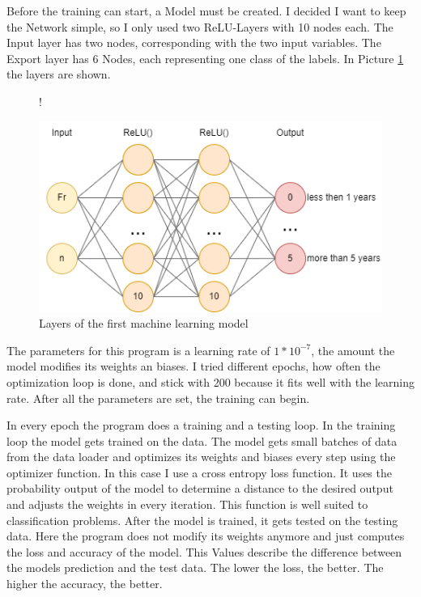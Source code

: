 \documentclass[a4paper, 12pt, oneside]{scrbook}
\begin{document}
				\noindent Before the training can start, a Model must be created. I decided I want to keep the Network simple, so I only used two ReLU-Layers with 10 nodes each. The Input layer has two nodes, corresponding with the two input variables. The Export layer has 6 Nodes, each representing one class of the labels. In Picture \ref{fig:layer_first} the layers are shown. 
				
				\begin{figure} [H]
					\centering
					\resizebox{\linewidth} {!} {
						\includegraphics{res/firstEDA/layer_model.png}
						
					}
					\caption{Layers of the first machine learning model}
					\label{fig:layer_first}
				\end{figure}
			
				\noindent The parameters for this program is a learning rate of $1 * 10^{-7}$, the amount the model modifies its weights an biases. I tried different epochs, how often the optimization loop is done, and stick with 200 because it fits well with the learning rate. After all the parameters are set, the training can begin. 
				
				\noindent In every epoch the program does a training and a testing loop. In the training loop the model gets trained on the data. The model gets small batches of data from the data loader and optimizes its weights and biases every step using the optimizer function. In this case I use a cross entropy loss function. It uses the probability output of the model to determine a distance to the desired output and adjusts the weights in every iteration. This function is well suited to classification problems. After the model is trained, it gets tested on the testing data. Here the program does not modify its weights anymore and just computes the loss and accuracy of the model. This Values describe the difference between the models prediction and the test data. The lower the loss, the better. The higher the accuracy, the better. 
				
\end{document}
